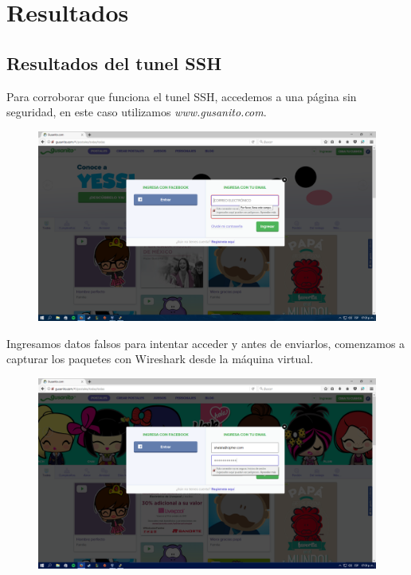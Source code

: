 \documentclass{article}
\begin{document}
\section{Resultados}

\subsection{Resultados del tunel SSH}
Para corroborar que funciona el tunel SSH, accedemos a una p\'agina sin seguridad, en este caso utilizamos \emph{www.gusanito.com}.

\begin{figure}[H]
\centering
\includegraphics[width=1\textwidth]{14-GUSANITO}
\end{figure}

Ingresamos datos falsos para intentar acceder y antes de enviarlos, comenzamos a capturar los paquetes con Wireshark desde la m\'aquina virtual.

\begin{figure}[H]
\centering
\includegraphics[width=1\textwidth]{15-CORREO}
\end{figure}
\end{document}
